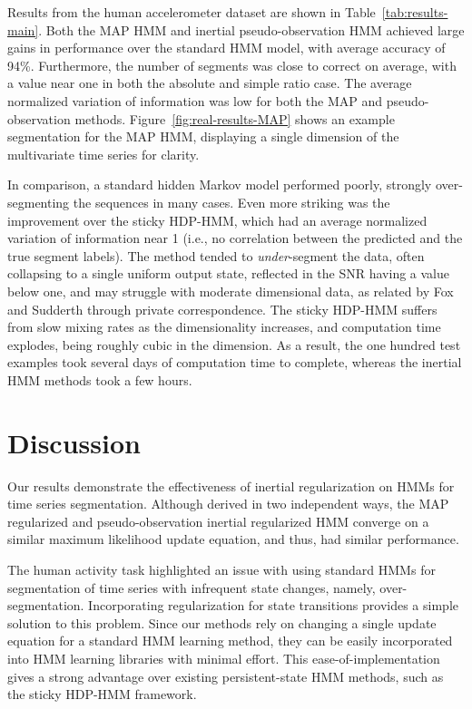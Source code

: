 \documentclass[letterpaper]{article}
\begin{document}
Results from the human accelerometer dataset are shown in
Table~\ref{tab:results-main}. Both the MAP HMM and inertial pseudo-observation
HMM achieved large gains in performance over the standard HMM model, with
average accuracy of 94\%. Furthermore, the number of segments was close to
correct on average, with a value near one in both the absolute and simple ratio
case. The average normalized variation of information was low for both the MAP and pseudo-observation methods.
Figure~\ref{fig:real-results-MAP} shows an example segmentation for the MAP HMM, displaying a single dimension of the
multivariate time series for clarity.

In comparison, a standard hidden Markov model performed poorly, strongly over-segmenting the 
sequences in many cases. Even more striking was the improvement over the sticky HDP-HMM, which 
had an average normalized variation of information near 1 (i.e., no correlation between
the predicted and the true segment labels). The method tended to
\emph{under}-segment the data, often collapsing to a single uniform output state, reflected in the SNR 
having a value below one, and may struggle with moderate dimensional data, as related by Fox and 
Sudderth through private correspondence. The sticky HDP-HMM suffers from slow mixing rates as the
dimensionality increases, and computation time explodes, being roughly cubic in
the dimension. As a result, the one hundred test examples took several days of
computation time to complete, whereas the inertial HMM methods took a few hours.

\section{Discussion}

Our results demonstrate the effectiveness of inertial regularization on HMMs for
time series segmentation. Although derived in two independent ways, the MAP
regularized and pseudo-observation inertial regularized HMM converge on a
similar maximum likelihood update equation, and thus, had similar performance.

The human activity task highlighted an issue with using standard HMMs for
segmentation of time series with infrequent state changes, namely,
over-segmentation. Incorporating regularization for state transitions provides a
simple solution to this problem. Since our methods rely on changing a single
update equation for a standard HMM learning method, they can be easily
incorporated into HMM learning libraries with minimal effort. This
ease-of-implementation gives a strong advantage over existing persistent-state
HMM methods, such as the sticky HDP-HMM framework.
\end{document}
